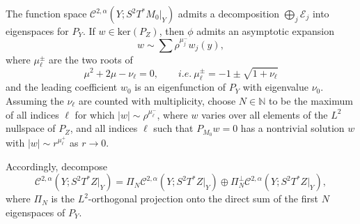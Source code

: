 \documentclass[12pt]{article}
\newcommand{\calE}{\mathcal E}
\newcommand{\calC}{\mathcal C}
\newcommand{\NN}{\mathbb N}
\begin{document}
The function space $\calC^{2,\alpha}(Y; S^2T^*M_0|_Y)$ admits a decomposition $\bigoplus_j \calE_j$ into eigenspaces for
$P_Y$.    If $w \in \mathrm{ker}(P_Z)$, then $\phi$ admits an asymptotic expansion 
\[
w \sim \sum \rho^{\mu_j^-} w_j(y),
\]
where $\mu_\ell^\pm$ are the two roots of 
\[
\mu^2 + 2\mu - \nu_\ell = 0, \qquad i.e.\ \mu_\ell^\pm =  -1 \pm \sqrt{1 + \nu_\ell} 
\]
and the leading coefficient $w_0$ is an eigenfunction of $P_Y$ with eigenvalue $\nu_0$.   Assuming the $\nu_\ell$ are counted with multiplicity, 
choose $N \in \NN$ to be the maximum of all indices $\ell$ for which $|w| \sim \rho^{\mu_\ell^-}$, where $w$ varies over all elements of 
the $L^2$ nullspace of $P_Z$, and all indices $\ell$ such that $P_{M_0}w=0$ has a nontrivial solution $w$ with $|w| \sim
r^{\mu_\ell^+}$ as $r \to 0$. 

Accordingly, decompose
\[
\calC^{2,\alpha}(Y; S^2T^*Z|_Y) = \Pi_N \calC^{2,\alpha}(Y;  S^2T^*Z|_Y) \oplus \Pi_N^\perp \calC^{2,\alpha}(Y; S^2T^*Z|_Y),
\]
where $\Pi_N$ is the $L^2$-orthogonal projection onto the direct sum of the first $N$ eigenspaces of $P_Y$. 
\end{document}
